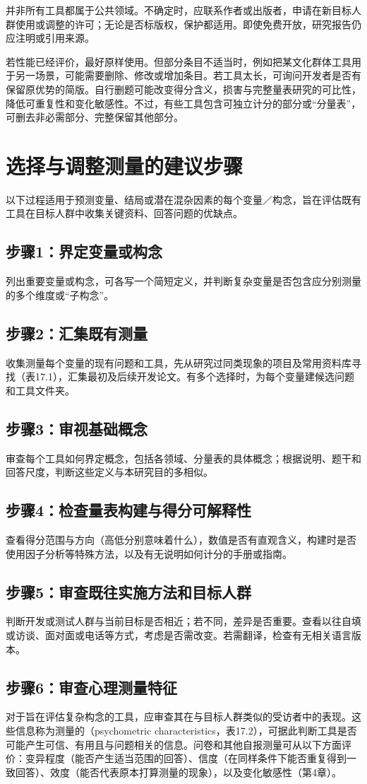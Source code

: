 并非所有工具都属于公共领域。不确定时，应联系作者或出版者，申请在新目标人群使用或调整的许可；无论是否标版权，保护都适用。即使免费开放，研究报告仍应注明或引用来源。

若性能已经评价，最好原样使用。但部分条目不适当时，例如把某文化群体工具用于另一场景，可能需要删除、修改或增加条目。若工具太长，可询问开发者是否有保留原优势的简版。自行删题可能改变得分含义，损害与完整量表研究的可比性，降低可重复性和变化敏感性。不过，有些工具包含可独立计分的部分或“分量表”，可删去非必需部分、完整保留其他部分。

\section{选择与调整测量的建议步骤}
以下过程适用于预测变量、结局或潜在混杂因素的每个变量／构念，旨在评估既有工具在目标人群中收集关键资料、回答问题的优缺点。
\subsection{步骤1：界定变量或构念}
列出重要变量或构念，可各写一个简短定义，并判断复杂变量是否包含应分别测量的多个维度或“子构念”。
\subsection{步骤2：汇集既有测量}
收集测量每个变量的现有问题和工具，先从研究过同类现象的项目及常用资料库寻找（表17.1），汇集最初及后续开发论文。有多个选择时，为每个变量建候选问题和工具文件夹。
\subsection{步骤3：审视基础概念}
审查每个工具如何界定概念，包括各领域、分量表的具体概念；根据说明、题干和回答尺度，判断这些定义与本研究目的多相似。
\subsection{步骤4：检查量表构建与得分可解释性}
查看得分范围与方向（高低分别意味着什么），数值是否有直观含义，构建时是否使用因子分析等特殊方法，以及有无说明如何计分的手册或指南。
\subsection{步骤5：审查既往实施方法和目标人群}
判断开发或测试人群与当前目标是否相近；若不同，差异是否重要。查看以往自填或访谈、面对面或电话等方式，考虑是否需改变。若需翻译，检查有无相关语言版本。
\subsection{步骤6：审查心理测量特征}
对于旨在评估复杂构念的工具，应审查其在与目标人群类似的受访者中的表现。这些信息称为测量的（psychometric characteristics，表17.2），可据此判断工具是否可能产生可信、有用且与问题相关的信息。问卷和其他自报测量可从以下方面评价：变异程度（能否产生适当范围的回答）、信度（在同样条件下能否重复得到一致回答）、效度（能否代表原本打算测量的现象），以及变化敏感性（第4章）。

